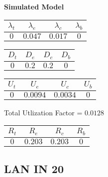 \documentclass{article}
\begin{document}
\begin{minipage}{0.5\textwidth}
\centering	\textbf{Simulated Model}
\begin{table}[H]
\centering
\begin{tabular}{@{}cccc@{}}
\toprule
$\lambda_t$ & $\lambda_e$ & $\lambda_c$ & $\lambda_b$\\
\midrule
$0$ & $0.047$ & $0.017$ & $0$\\
\bottomrule
\end{tabular}
\end{table}
\begin{table}[H]
\centering
\begin{tabular}{@{}cccc@{}}
\toprule
$D_t$ & $D_e$ & $D_c$ & $D_b$\\
\midrule
$0$ & $0.2$ & $0.2$ & $0$\\
\bottomrule
\end{tabular}
\end{table}\begin{table}[H]
\centering
\begin{tabular}{@{}cccc@{}}
\toprule
$U_t$ & $U_e$ & $U_c$ & $U_b$\\
\midrule
$0$ & $0.0094$ & $0.0034$ & $0$\\
\bottomrule
\end{tabular}
\end{table}
\centering Total Utlization Factor = $0.0128$
\begin{table}[H]
\centering
\begin{tabular}{@{}cccc@{}}
\toprule
$R_t$ & $R_e$ & $R_c$ & $R_b$\\
\midrule
$0$ & $0.203$ & $0.203$ & $0$\\
\bottomrule
\end{tabular}
\end{table}
\end{minipage}\subsection{LAN IN 20}
\end{document}
